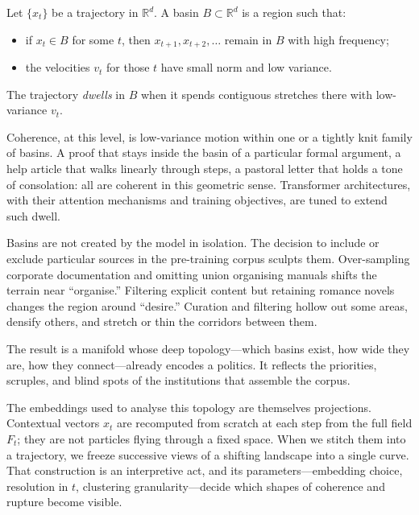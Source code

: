 \documentclass[12pt,a4paper]{article}
\begin{document}
\begin{formalbox}[title={Basins and dwell}]
Let $\{x_t\}$ be a trajectory in $\mathbb{R}^d$. A basin $B \subset \mathbb{R}^d$ is a region such that:

\begin{itemize}
\item if $x_t \in B$ for some $t$, then $x_{t+1}, x_{t+2}, \ldots$ remain in $B$ with high frequency;
\item the velocities $v_t$ for those $t$ have small norm and low variance.
\end{itemize}

The trajectory \emph{dwells} in $B$ when it spends contiguous stretches there with low-variance $v_t$.
\end{formalbox}

Coherence, at this level, is low-variance motion within one or a tightly knit family of basins. A proof that stays inside the basin of a particular formal argument, a help article that walks linearly through steps, a pastoral letter that holds a tone of consolation: all are coherent in this geometric sense. Transformer architectures, with their attention mechanisms and training objectives, are tuned to extend such dwell.

Basins are not created by the model in isolation. The decision to include or exclude particular sources in the pre-training corpus sculpts them. Over-sampling corporate documentation and omitting union organising manuals shifts the terrain near ``organise.'' Filtering explicit content but retaining romance novels changes the region around ``desire.'' Curation and filtering hollow out some areas, densify others, and stretch or thin the corridors between them.

The result is a manifold whose deep topology---which basins exist, how wide they are, how they connect---already encodes a politics. It reflects the priorities, scruples, and blind spots of the institutions that assemble the corpus.

The embeddings used to analyse this topology are themselves projections. Contextual vectors $x_t$ are recomputed from scratch at each step from the full field $F_t$; they are not particles flying through a fixed space. When we stitch them into a trajectory, we freeze successive views of a shifting landscape into a single curve. That construction is an interpretive act, and its parameters---embedding choice, resolution in $t$, clustering granularity---decide which shapes of coherence and rupture become visible.
\end{document}
